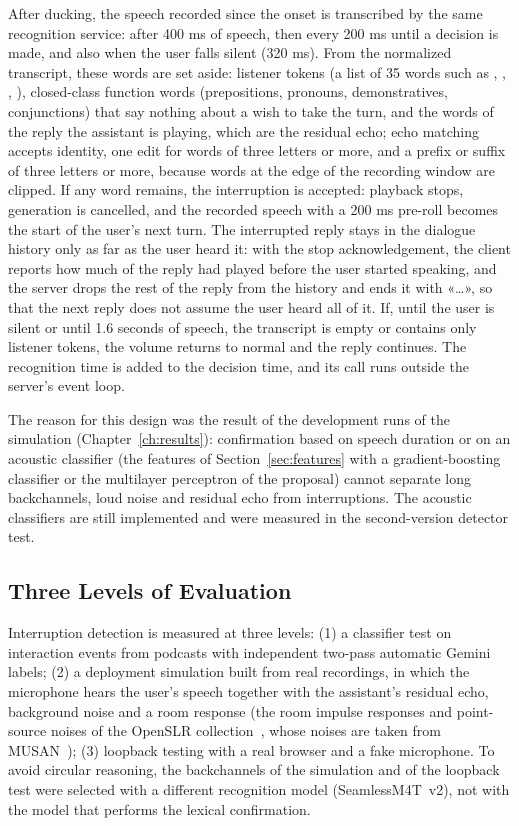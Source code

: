 After ducking, the speech recorded since the onset is transcribed by the same
recognition service: after 400 ms of speech, then every 200 ms until a decision is made,
and also when the user falls silent (320 ms). From the normalized transcript, these
words are set aside: listener tokens (a list of 35 words such as , ,
, ), closed-class function words (prepositions, pronouns,
demonstratives, conjunctions) that say nothing about a wish to take the turn, and the
words of the reply the assistant is playing, which are the residual echo; echo matching
accepts identity, one edit for words of three letters or more, and a prefix or suffix of
three letters or more, because words at the edge of the recording window are clipped. If
any word remains, the interruption is accepted: playback stops, generation is cancelled,
and the recorded speech with a 200 ms pre-roll becomes the start of the user's next turn.
The interrupted reply stays in the dialogue history only as far as the user heard it: with
the stop acknowledgement, the client reports how much of the reply had played before the
user started speaking, and the server drops the rest of the reply from the history and
ends it with «\ldots», so that the next reply does not assume the user heard all of it.
If, until the user is silent or until 1.6 seconds of speech, the transcript is empty or
contains only listener tokens, the volume returns to normal and the reply continues. The
recognition time is added to the decision time, and its call runs outside the server's
event loop.

The reason for this design was the result of the development runs of the simulation
(Chapter~\ref{ch:results}): confirmation based on speech duration or on an acoustic
classifier (the features of Section~\ref{sec:features} with a gradient-boosting
classifier or the multilayer perceptron of the proposal) cannot separate long
backchannels, loud noise and residual echo from interruptions. The acoustic classifiers
are still implemented and were measured in the second-version detector test.

\subsection{Three Levels of Evaluation}

Interruption detection is measured at three levels: (1) a classifier test on
interaction events from podcasts with independent two-pass automatic Gemini labels;
(2) a deployment simulation built from real recordings, in which the microphone hears
the user's speech together with the assistant's residual echo, background noise and a
room response (the room impulse responses and point-source noises of the OpenSLR
collection~\cite{ko2017rir}, whose noises are taken from MUSAN~\cite{snyder2015musan});
(3) loopback testing with a real browser and a fake microphone. To avoid circular
reasoning, the backchannels of the simulation and of the loopback test were selected
with a different recognition model (SeamlessM4T~v2), not with the model that performs
the lexical confirmation.

